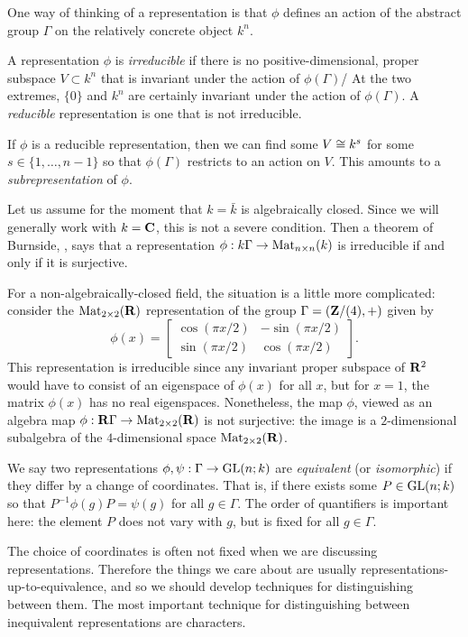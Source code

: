 \documentclass[11pt, oneside, usenames, dvipsnames, svgnames, table, final]{amsart}
\begin{document}
One way of thinking of a representation is that $\phi$ defines an action of the abstract group $\Gamma$ on the
relatively concrete object $k^n$.

A representation $\phi$ is \emph{irreducible} if there is no positive-dimensional, proper subspace $V \subset k^n$ that
is invariant under the action of $\phi(\Gamma)$/ At the two extremes, $\{0\}$ and $k^n$ are certainly invariant under
the action of $\phi(\Gamma)$. A \emph{reducible} representation is one that is not irreducible.

If $\phi$ is a reducible representation, then we can find some $V \cong k^s$ for some $s \in \{1, \dots, n-1\}$ so that
$\phi(\Gamma)$ restricts to an action on $V$. This amounts to a \emph{subrepresentation} of $\phi$.

\begin{remark}
Let us assume for the moment that $k = \bar k$ is algebraically closed. Since we will generally work with $k = \mathbf{C}$,
this is not a severe condition. Then a theorem of Burnside, \cite{Lomonosov2004}, says that a
representation $\phi : k \Gamma \to \operatorname{Mat}_{n \times n}(k)$ is irreducible if and only if it is surjective.

For a non-algebraically-closed field, the situation is a little more complicated: consider the $\operatorname{Mat}_{2\times 2}(\mathbf{R})$ representation of the
group $\Gamma=(\mathbf{Z}/(4), +)$ given by \[ \phi(x) =
\begin{bmatrix}
  \cos(\pi x/2) & -\sin(\pi x/2) \\ \sin(\pi x/2) & \cos(\pi x/2)
\end{bmatrix}.\] This representation is irreducible since any invariant proper subspace of $\mathbf{R}^2$ would have to consist
of an eigenspace of $\phi(x)$ for all $x$, but for $x=1$, the matrix $\phi(x)$ has no real eigenspaces. Nonetheless,
the map $\phi$, viewed as an algebra map $\phi : \mathbf{R} \Gamma \to \operatorname{Mat}_{2 \times 2}(\mathbf{R})$ is not surjective: the image
is a $2$-dimensional subalgebra of the $4$-dimensional space $\operatorname{Mat}_{2 \times 2}(\mathbf{R})$.
\end{remark}

We say two representations $\phi, \psi : \Gamma \to \operatorname{GL}(n;k)$ are \emph{equivalent} (or \emph{isomorphic}) if they
differ by a change of coordinates. That is, if there exists some $P \in \operatorname{GL}(n; k)$ so that $P^{-1} \phi(g) P = \psi(g)$
for all $g \in \Gamma$. The order of quantifiers is important here: the element $P$ does not vary with $g$, but is fixed
for all $g \in \Gamma$.

The choice of coordinates is often not fixed when we are discussing representations. Therefore the things we care about
are usually representations-up-to-equivalence, and so we should develop techniques for distinguishing between them. The
most important technique for distinguishing between inequivalent representations are characters.
\end{document}
